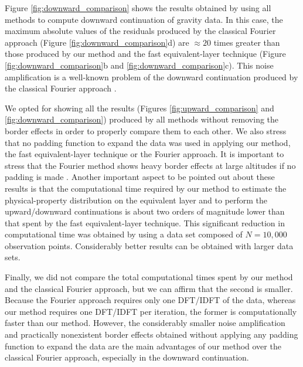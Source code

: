 Figure \ref{fig:downward_comparison} shows the results obtained by using all 
methods to compute downward continuation of gravity data.
In this case, the maximum absolute values of the residuals produced by the 
classical Fourier approach (Figure \ref{fig:downward_comparison}d) are 
$\approx 20$ times greater than those produced by our method and the fast equivalent-layer technique (Figure \ref{fig:downward_comparison}b and \ref{fig:downward_comparison}c).
This noise amplification is a well-known problem of the downward continuation 
produced by the classical Fourier approach \citep[e.g., ][ p. 320]{blakely1996}.

We opted for showing all the results (Figures \ref{fig:upward_comparison} and 
\ref{fig:downward_comparison}) produced by all methods without removing the border 
effects in order to properly compare them to each other.
We also stress that no padding function to expand the data was used in applying 
our method, the fast equivalent-layer technique or the Fourier approach.
It is important to stress that the Fourier method shows heavy border effects at large 
altitudes if no padding is made \citep{baniamerian_etal2017}. 
Another important aspect to be pointed out about these results 
is that the computational time required by our method to estimate the physical-property 
distribution on the equivalent layer and to perform the upward/downward continuations 
is about two orders of magnitude lower than that spent by the fast equivalent-layer technique.
This significant reduction in computational time was obtained by using a data set 
composed of $N = 10,000$ observation points. Considerably better results can be 
obtained with larger data sets.

Finally, we did not compare the total computational times spent by our method 
and the classical Fourier approach, but we can affirm that the second is smaller. 
Because  the Fourier approach requires only one DFT/IDFT of the data, whereas 
our method requires one DFT/IDFT per iteration, the former is computationally faster 
than our method.
However, the considerably smaller noise amplification and practically nonexistent 
border effects obtained without applying any padding function to expand 
the data are the main advantages of our method over the classical Fourier 
approach, especially in the downward continuation. 
